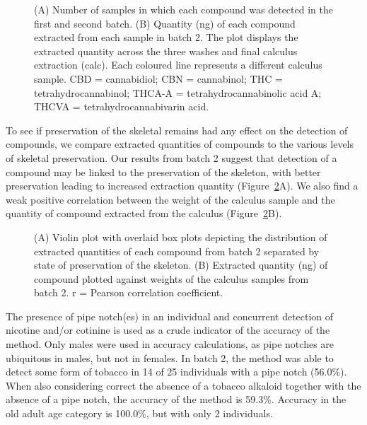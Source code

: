 \documentclass[
  11pt,
  leqno]{scrartcl}
\begin{document}
\begin{figure}


\caption{\label{fig-auth-plot-batch2}(A) Number of samples in which each
compound was detected in the first and second batch. (B) Quantity (ng)
of each compound extracted from each sample in batch 2. The plot
displays the extracted quantity across the three washes and final
calculus extraction (calc). Each coloured line represents a different
calculus sample. CBD = cannabidiol; CBN = cannabinol; THC =
tetrahydrocannabinol; THCA-A = tetrahydrocannabinolic acid A; THCVA =
tetrahydrocannabivarin acid.}

\end{figure}%

To see if preservation of the skeletal remains had any effect on the
detection of compounds, we compare extracted quantities of compounds to
the various levels of skeletal preservation. Our results from batch 2
suggest that detection of a compound may be linked to the preservation
of the skeleton, with better preservation leading to increased
extraction quantity (Figure~\ref{fig-detection-preservation}A). We also
find a weak positive correlation between the weight of the calculus
sample and the quantity of compound extracted from the calculus
(Figure~\ref{fig-detection-preservation}B).

\begin{figure}


\caption{\label{fig-detection-preservation}(A) Violin plot with overlaid
box plots depicting the distribution of extracted quantities of each
compound from batch 2 separated by state of preservation of the
skeleton. (B) Extracted quantity (ng) of compound plotted against
weights of the calculus samples from batch 2. r = Pearson correlation
coefficient.}

\end{figure}%

The presence of pipe notch(es) in an individual and concurrent detection
of nicotine and/or cotinine is used as a crude indicator of the accuracy
of the method. Only males were used in accuracy calculations, as pipe
notches are ubiquitous in males, but not in females. In batch 2, the
method was able to detect some form of tobacco in 14 of 25 individuals
with a pipe notch (56.0\%). When also considering correct the absence of
a tobacco alkaloid together with the absence of a pipe notch, the
accuracy of the method is 59.3\%. Accuracy in the old adult age category
is 100.0\%, but with only 2 individuals.
\end{document}
